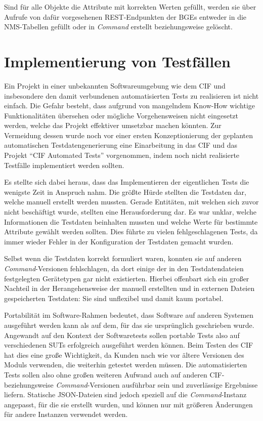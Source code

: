Sind für alle Objekte die Attribute mit korrekten Werten gefüllt, werden sie über Aufrufe von dafür vorgesehenen \ac{REST}-Endpunkten der \ac{BGE}s entweder in die \ac{NMS}-Tabellen gefüllt oder in \textit{Command} erstellt beziehungsweise gelöscht.

\section{Implementierung von Testfällen}\label{sec:testimplementierung}
Ein Projekt in einer unbekannten Softwareumgebung wie dem \ac{CIF} und insbesondere den damit verbundenen automatisierten Tests zu realisieren ist nicht einfach. Die Gefahr besteht, dass aufgrund von mangelndem Know-How wichtige Funktionalitäten übersehen oder mögliche Vorgehensweisen nicht eingesetzt werden, welche das Projekt effektiver umsetzbar machen könnten. Zur Vermeidung dessen wurde noch vor einer ersten Konzeptionierung der geplanten automatischen Testdatengenerierung eine Einarbeitung in das \ac{CIF} und das Projekt \enquote{CIF Automated Tests} vorgenommen, indem noch nicht realisierte Testfälle implementiert werden sollten.

Es stellte sich dabei heraus, dass das Implementieren der eigentlichen Tests die wenigste Zeit in Anspruch nahm. Die größte Hürde stellten die Testdaten dar, welche manuell erstellt werden mussten. Gerade Entitäten, mit welchen sich zuvor nicht beschäftigt wurde, stellten eine Herausforderung dar. Es war unklar, welche Informationen die Testdaten beinhalten mussten und welche Werte für bestimmte Attribute gewählt werden sollten. Dies führte zu vielen fehlgeschlagenen Tests, da immer wieder Fehler in der Konfiguration der Testdaten gemacht wurden.

Selbst wenn die Testdaten korrekt formuliert waren, konnten sie auf anderen \textit{Command}-Versionen fehlschlagen, da dort einige der in den Testdatendateien festgelegten Gerätetypen gar nicht existierten. Hierbei offenbart sich ein großer Nachteil in der Herangehensweise der manuell erstellten und in externen Dateien gespeicherten Testdaten: Sie sind unflexibel und damit kaum portabel. 

Portabilität im Software-Rahmen bedeutet, dass Software auf anderen Systemen ausgeführt werden kann als auf dem, für das sie ursprünglich geschrieben wurde. \cite{brown:2003} Angewandt auf den Kontext der Softwaretests sollen portable Tests also auf verschiedenen \ac{SUT}s erfolgreich ausgeführt werden können. Beim Testen des \ac{CIF} hat dies eine große Wichtigkeit, da Kunden nach wie vor ältere Versionen des Moduls verwenden, die weiterhin getestet werden müssen. Die automatisierten Tests sollen also ohne großen weiteren Aufwand auch auf anderen \ac{CIF}- beziehungsweise \textit{Command}-Versionen ausführbar sein und zuverlässige Ergebnisse liefern. Statische \ac{JSON}-Dateien sind jedoch speziell auf die \textit{Command}-Instanz angepasst, für die sie erstellt wurden, und können nur mit größeren Änderungen für andere Instanzen verwendet werden. 

